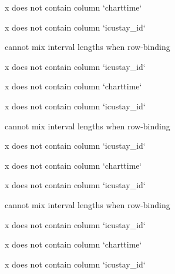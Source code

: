 \documentclass[
]{jss}
\begin{document}
\begin{CodeChunk}
\begin{CodeOutput}
x does not contain column `charttime`
\end{CodeOutput}

\begin{CodeOutput}
x does not contain column `icustay_id`
\end{CodeOutput}

\begin{CodeOutput}
cannot mix interval lengths when row-binding
\end{CodeOutput}

\begin{CodeOutput}
x does not contain column `icustay_id`
\end{CodeOutput}

\begin{CodeOutput}
x does not contain column `charttime`
\end{CodeOutput}

\begin{CodeOutput}
x does not contain column `icustay_id`
\end{CodeOutput}

\begin{CodeOutput}
cannot mix interval lengths when row-binding
\end{CodeOutput}

\begin{CodeOutput}
x does not contain column `icustay_id`
\end{CodeOutput}

\begin{CodeOutput}
x does not contain column `charttime`
\end{CodeOutput}

\begin{CodeOutput}
x does not contain column `icustay_id`
\end{CodeOutput}

\begin{CodeOutput}
cannot mix interval lengths when row-binding
\end{CodeOutput}

\begin{CodeOutput}
x does not contain column `icustay_id`
\end{CodeOutput}

\begin{CodeOutput}
x does not contain column `charttime`
\end{CodeOutput}

\begin{CodeOutput}
x does not contain column `icustay_id`
\end{CodeOutput}


\end{CodeChunk}
\end{document}
